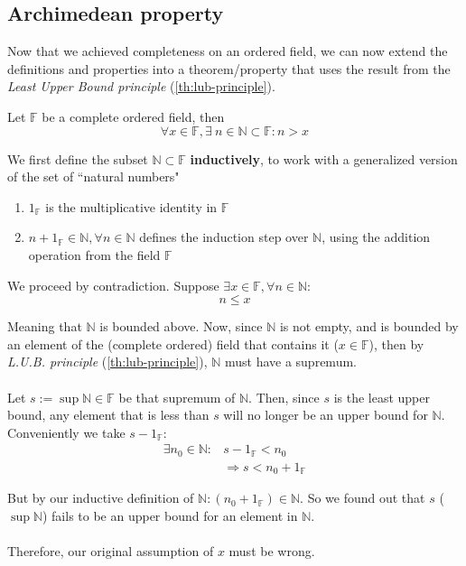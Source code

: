 \subsection{Archimedean property}

Now that we achieved completeness on an ordered field, we can now extend the definitions and properties into a theorem/property that uses the result from the \textit{Least Upper Bound principle} (\cref{th:lub-principle}).

\begin{theorem}\label{th:archimedean}
Let $\mathbb{F}$ be a complete ordered field, then $$\forall x \in \mathbb{F}, \exists \ n \in \mathbb{N} \subset \mathbb{F}: n > x$$
\end{theorem}

\begin{bookproof}
We first define the subset $\mathbb{N} \subset \mathbb{F}$ \textbf{inductively}, to work with a generalized version of the set of \textquotedblleft natural numbers"
\begin{enumerate}
\item $1_{\mathbb{F}}$ is the multiplicative identity in $\mathbb{F}$
\item $n + 1_{\mathbb{F}} \in \mathbb{N}, \forall n \in \mathbb{N}$ defines the induction step over $\mathbb{N}$, using the addition operation from the field $\mathbb{F}$
\end{enumerate}

We proceed by contradiction. Suppose $\exists x \in \mathbb{F}, \forall n \in \mathbb{N}:$
$$
n \leq x
$$

Meaning that $\mathbb{N}$ is bounded above. Now, since $\mathbb{N}$ is not empty, and is bounded by an element of the (complete ordered) field that contains it ($x \in \mathbb{F}$), then by \textit{L.U.B. principle} (\cref{th:lub-principle}), $\mathbb{N}$ must have a supremum.
\\\\
Let $s := \sup{\mathbb{N}} \in \mathbb{F}$ be that supremum of $\mathbb{N}$. Then, since $s$ is the least upper bound, any element that is less than $s$ will no longer be an upper bound for $\mathbb{N}$. Conveniently we take $s - 1_{\mathbb{F}}$:
\begin{align*}
\exists n_0 \in \mathbb{N}:& s - 1_{\mathbb{F}} < n_0\\
&\Rightarrow s < n_0 + 1_{\mathbb{F}}
\end{align*}

But by our inductive definition of $\mathbb{N}: (n_0 + 1_{\mathbb{F}}) \in \mathbb{N}$. So we found out that $s$ ($\sup{\mathbb{N}}$) fails to be an upper bound for an element in $\mathbb{N}$.
\\\\
Therefore, our original assumption of $x$ must be wrong.
\end{bookproof}

